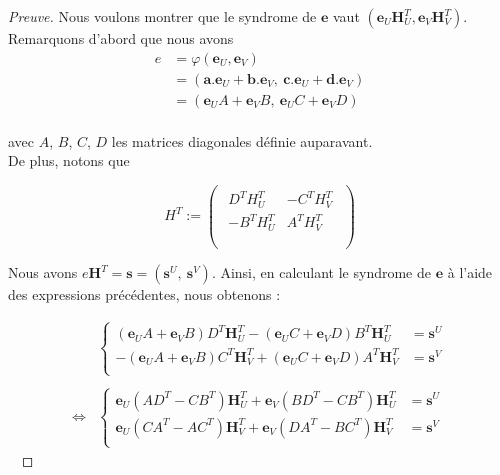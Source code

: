 \documentclass[12pt]{article}
\theoremstyle{plain}
\theoremstyle{definition}
\newcommand{\e}{\mathbf{e}}
\newcommand{\s}{\mathbf{s}}
\begin{document}
\vspace{0.2in}
\begin{proof}[Preuve]
Nous voulons montrer que le syndrome de $\e$ vaut $(\e_U\mathbf{H}_U^T,\e_V\mathbf{H}_V^T)$.
Remarquons d'abord que nous avons
\begin{equation*}
\begin{split}
e &= \varphi(\e_U,\e_V)\\
&= (\mathbf{a}.\e_U + \mathbf{b}.\e_V,\ \mathbf{c}.\e_U + \mathbf{d}.\e_V)\\
&= (\e_U A + \e_V B,\ \e_U C + \e_V D)\\
\end{split}
\end{equation*}

\noindent avec $A$, $B$, $C$, $D$ les matrices diagonales définie auparavant.\\
De plus, notons que

\vspace{0.1in}
$$ 
H^T :=
\begin{pmatrix}
\begin{array}{c|c}
D^TH_U^T & -C^TH_V^T \\
 \hline 
-B^TH_U^T & A^TH_V^T \\
\end{array} \\
\end{pmatrix}
$$
\vspace{0.1in}

\noindent Nous avons $e\mathbf{H}^T = \s = (\s^U,\ \s^V)$. Ainsi, en calculant le syndrome de $\e$ à l'aide des expressions précédentes, nous obtenons :

\begin{equation*}
\begin{aligned}
&\left\{
\begin{split}
(\e_UA+\e_VB)D^T\mathbf{H}_U^T - (\e_UC+\e_VD)B^T\mathbf{H}_U^T &= \s^U \\ 
-(\e_UA+\e_VB)C^T\mathbf{H}_V^T + (\e_UC+\e_VD)A^T\mathbf{H}_V^T &= \s^V \\
\end{split}
\right.\\
\\
\iff
&\left\{
\begin{split}
\e_U(AD^T - CB^T)\mathbf{H}_U^T + \e_V(BD^T-CB^T)\mathbf{H}_U^T &= \s^U \\ 
\e_U(CA^T - AC^T)\mathbf{H}_V^T + \e_V(DA^T-BC^T)\mathbf{H}_V^T &= \s^V \\ 
\end{split}
\right.
\end{aligned}
\end{equation*}\


\end{proof}
\end{document}
